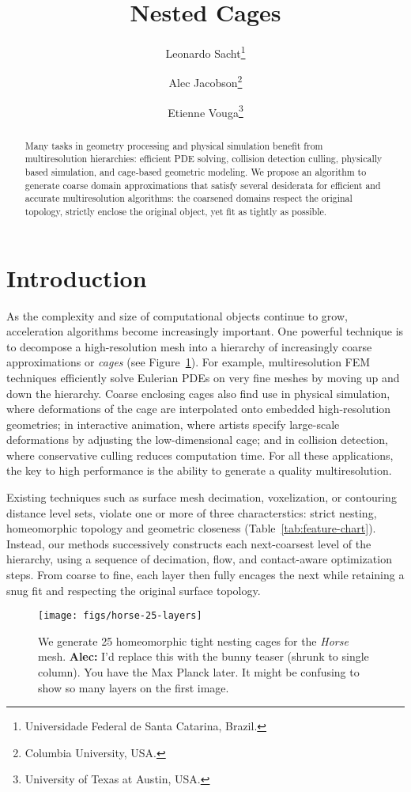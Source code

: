 \documentclass{cgyrf15}
\title{Nested Cages}
\author{
Leonardo Sacht\thanks{Universidade Federal de Santa Catarina, Brazil.} \and
Alec Jacobson\thanks{Columbia University, USA.} \and
Etienne Vouga\thanks{University of Texas at Austin, USA.} 
}
\newcommand{\alec}[1]{{\textcolor[rgb]{0.1,0.6,0.1}{\textbf{Alec:} #1}}}
\begin{document}
\maketitle

\begin{abstract}
Many tasks in geometry processing and physical simulation benefit from
multiresolution hierarchies: efficient PDE solving, collision detection
culling, physically based simulation, and cage-based geometric modeling. We
propose an algorithm to generate coarse domain approximations that satisfy
several desiderata for efficient and accurate multiresolution algorithms: the
coarsened domains respect the original topology, strictly enclose the original
object, yet fit as tightly as possible.
\end{abstract}

\section{Introduction}

As the complexity and size of computational objects continue to grow,
acceleration algorithms become increasingly important. One powerful technique
is to decompose a high-resolution mesh into a hierarchy of increasingly coarse
approximations or \emph{cages} (see Figure~\ref{fig:horse}). For example,
multiresolution FEM techniques efficiently solve Eulerian PDEs on very fine
meshes by moving up and down the hierarchy.  Coarse enclosing cages also find
use in physical simulation, where deformations of the cage are interpolated
onto embedded high-resolution geometries; in interactive animation, where
artists specify large-scale deformations by adjusting the low-dimensional cage;
and in collision detection, where conservative culling reduces computation
time. For all these applications, the key to high performance is the ability to
generate a quality multiresolution.

Existing techniques such as surface mesh decimation, voxelization, or
contouring distance level sets, violate one or more of three characterstics:
strict nesting, homeomorphic topology and geometric closeness
(Table~\ref{tab:feature-chart}).  Instead, our methods successively constructs
each next-coarsest level of the hierarchy, using a sequence of decimation,
flow, and contact-aware optimization steps.  From coarse to fine, each layer
then fully encages the next while retaining a snug fit and respecting the
original surface topology.

\begin{figure}[t]
  \texttt{[image: figs/horse-25-layers]}
  \caption{We generate 25 homeomorphic tight nesting cages 
  for the \emph{Horse} mesh.
  \alec{I'd replace this with the bunny teaser (shrunk to single column). You
  have the Max Planck later.  It might be confusing to show so many layers on
  the first image.}
  }
  \label{fig:horse}
\end{figure}
\end{document}

